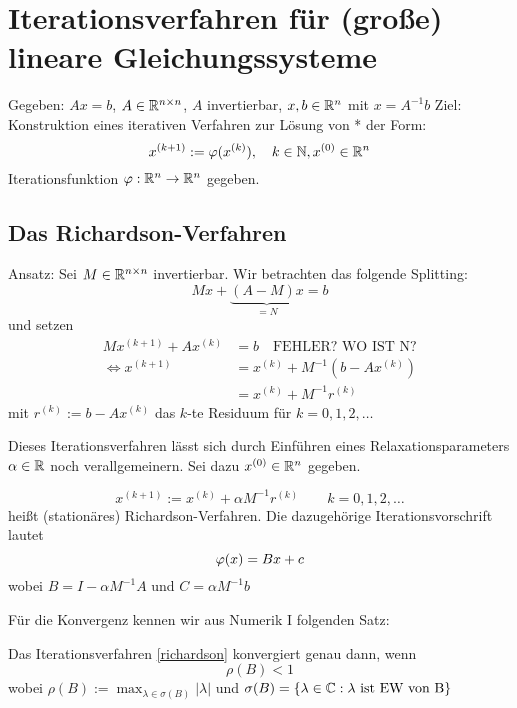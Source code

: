 \chapter[Iterationsverfahren für lineare Gleichungssysteme]{Iterationsverfahren für (große) lineare Gleichungssysteme}
Gegeben: $Ax=b$, $A\in \mathbb{R}^{n\times n}$, $A$ invertierbar, $x,b \in \mathbb{R}^n$ mit $x=A^{-1}b$
Ziel: Konstruktion eines iterativen Verfahren zur Lösung von * der Form:
\begin{equation}
  x^{(k+1)} := \varphi(x^{(k)}),\quad k\in \mathbb{N}, x^{(0)} \in \mathbb{R}^n
  \label{}
\end{equation}
Iterationsfunktion $\varphi: \mathbb{R}^n \to \mathbb{R}^n$ gegeben.

\section{Das Richardson-Verfahren}
Ansatz: Sei $M\in \mathbb{R}^{n\times n}$ invertierbar. Wir betrachten das folgende Splitting:
\begin{equation}
  Mx + \underbrace{(A-M)x}_{=N}= b
  \label{}
\end{equation}
und setzen 
\begin{equation}
  \begin{split}
    Mx^{(k+1)} + Ax^{(k)}     &= b \quad \text{FEHLER? WO IST N?}\\
    \Leftrightarrow x^{(k+1)} &= x^{(k)} + M^{-1}(b-Ax^{(k)})\\
    &= x^{(k)} + M^{-1}r^{(k)}
  \end{split}
  \label{}
\end{equation}
mit $ r^{(k)} := b-Ax^{(k)}$ das $k$-te Residuum für $k=0,1,2,\dots$

 Dieses Iterationsverfahren lässt sich durch Einführen eines Relaxationsparameters $\alpha \in \mathbb{R}$ noch verallgemeinern. Sei dazu $x^{(0)}\in \mathbb{R}^n$ gegeben. 

\begin{definition}
   \label{richardson}
   \[
     x^{(k+1)} := x^{(k)} + \alpha M^{-1} r^{(k)} \qquad k=0,1,2,\dots
   \]
   heißt (stationäres) Richardson-Verfahren. Die dazugehörige Iterationsvorschrift lautet
   \[
     \varphi(x) = Bx + c\\
   \]
   wobei $B=I-\alpha M^{-1}A$ und $C=\alpha M^{-1}b$
\end{definition}


Für die Konvergenz kennen wir aus Numerik I folgenden Satz:

\begin{satz}
  \label{itkonvergenz}
  Das Iterationsverfahren \eqref{richardson} konvergiert genau dann, wenn 
  \begin{equation}
    \rho (B) < 1 
    \label{}
  \end{equation}
  wobei $\rho(B) := \max_{\lambda \in \sigma(B)} |\lambda|$ und $\sigma(B) = \left\{ \lambda\in \mathbb{C}: \lambda \text{ ist EW von B} \right\}$
\end{satz}

